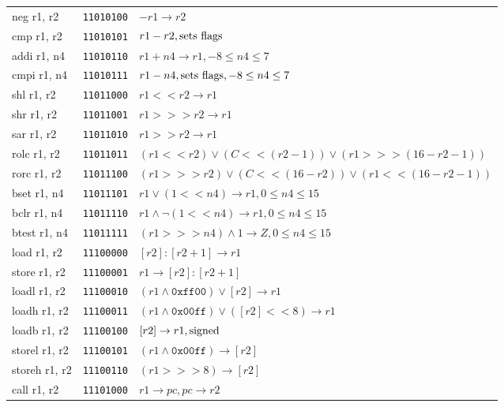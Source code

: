 \documentclass[10pt, twoside, a4paper]{article}
\newcommand{\shl}{\ensuremath{<\!\!<}}
\newcommand{\shr}{\ensuremath{>\!\!>\!\!>}}
\newcommand{\sar}{\ensuremath{>\!\!>}}
\newcommand{\at}{\ensuremath{\!\!:\!\!}}
\begin{document}
{\begin{longtable}{llp{}}
    neg r1, r2        & \texttt{11010100}     & $-r1 \rightarrow r2$ \\
    cmp r1, r2        & \texttt{11010101}     & $r1 - r2, \textnormal{sets flags}$ \\
    addi r1, n4       & \texttt{11010110}     & $r1 + n4 \rightarrow r1, -8 \leq n4 \leq 7$ \\
    cmpi r1, n4       & \texttt{11010111}     & $r1 - n4, \textnormal{sets flags}, -8 \leq n4 \leq 7$ \\
    shl r1, r2        & \texttt{11011000}     & $r1 \shl r2 \rightarrow r1$ \\
    shr r1, r2        & \texttt{11011001}     & $r1 \shr r2 \rightarrow r1$ \\
    sar r1, r2        & \texttt{11011010}     & $r1 \sar r2 \rightarrow r1$ \\
    rolc r1, r2       & \texttt{11011011}     & $(r1 \shl r2) \vee (C \shl (r2-1)) \vee (r1 \shr (16-r2-1))$ \\
    rorc r1, r2       & \texttt{11011100}     & $(r1 \shr r2) \vee (C \shl (16-r2)) \vee (r1 \shl (16-r2-1))$ \\
    bset r1, n4       & \texttt{11011101}     & $r1 \vee (1 \shl n4) \rightarrow r1, 0 \leq n4 \leq 15$ \\
    bclr r1, n4       & \texttt{11011110}     & $r1 \wedge \lnot (1 \shl n4) \rightarrow r1, 0 \leq n4 \leq 15$ \\
    btest r1, n4      & \texttt{11011111}     & $(r1 \shr n4) \wedge 1 \rightarrow Z, 0 \leq n4 \leq 15$ \\
  \hline
    load r1, r2       & \texttt{11100000}     & $[r2] \at [r2+1] \rightarrow r1$ \\
    store r1, r2      & \texttt{11100001}     & $r1 \rightarrow [r2] \at [r2+1]$ \\
    loadl r1, r2      & \texttt{11100010}     & $(r1 \wedge \texttt{0xff00}) \vee [r2] \rightarrow r1$ \\
    loadh r1, r2      & \texttt{11100011}     & $(r1 \wedge \texttt{0x00ff}) \vee ([r2] \shl 8) \rightarrow r1$ \\
    loadb r1, r2      & \texttt{11100100}     & $[r2] \rightarrow r1, \textnormal{signed}$ \\
    storel r1, r2     & \texttt{11100101}     & $(r1 \wedge \texttt{0x00ff}) \rightarrow [r2]$ \\
    storeh r1, r2     & \texttt{11100110}     & $(r1 \shr 8) \rightarrow [r2]$ \\
    call r1, r2       & \texttt{11101000}     & $r1 \rightarrow pc, pc \rightarrow r2$ \\

\end{longtable}}
\end{document}
